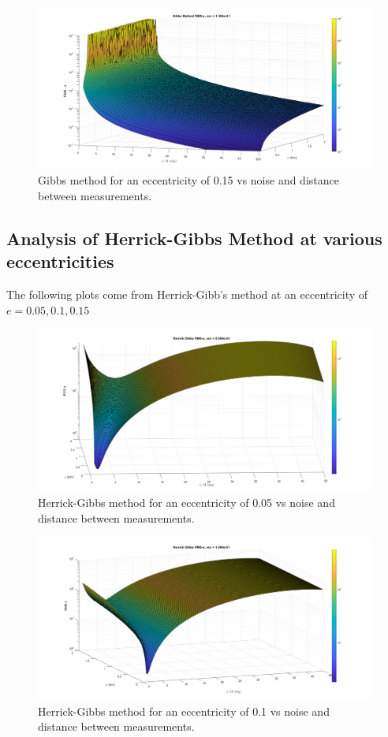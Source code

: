 \documentclass[12pt]{article}
\begin{document}
	\begin{figure}
	\centering
	\includegraphics[width=0.7\linewidth]{gibbs_e_15}
	\caption{Gibbs method for an eccentricity of 0.15 vs noise and distance between measurements.}
	\label{fig:gibbse15}
\end{figure}
	
	\newpage
	\subsection{Analysis of Herrick-Gibbs Method at various eccentricities}
		The following plots come from Herrick-Gibb's method at an eccentricity of $e=0.05,0.1,0.15$
		\begin{figure}
		\centering
		\includegraphics[width=0.7\linewidth]{herrickgibbs_e_05}
		\caption{Herrick-Gibbs method for an eccentricity of 0.05 vs noise and distance between measurements.}
		\label{fig:herrickgibbse05}
	\end{figure}
	
	\begin{figure}
		\centering
		\includegraphics[width=0.7\linewidth]{herrickgibbs_e_1}
		\caption{Herrick-Gibbs method for an eccentricity of 0.1 vs noise and distance between measurements.}
		\label{fig:herrickgibbse1}
	\end{figure}
	
\end{document}
